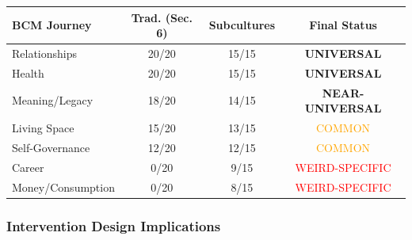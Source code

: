 \begin{center}
\begin{tabular}{@{}lccc@{}}
\toprule
\textbf{BCM Journey} & \textbf{Trad. (Sec. 6)} & \textbf{Subcultures} & \textbf{Final Status} \\
\midrule
Relationships & 20/20 & 15/15 & \textcolor{green!70!black}{\textbf{UNIVERSAL}} \\
Health & 20/20 & 15/15 & \textcolor{green!70!black}{\textbf{UNIVERSAL}} \\
Meaning/Legacy & 18/20 & 14/15 & \textcolor{green!70!black}{\textbf{NEAR-UNIVERSAL}} \\
Living Space & 15/20 & 13/15 & \textcolor{orange}{COMMON} \\
Self-Governance & 12/20 & 12/15 & \textcolor{orange}{COMMON} \\
Career & 0/20 & 9/15 & \textcolor{red}{WEIRD-SPECIFIC} \\
Money/Consumption & 0/20 & 8/15 & \textcolor{red}{WEIRD-SPECIFIC} \\
\bottomrule
\end{tabular}
\end{center}

\subsubsection{Intervention Design Implications}

